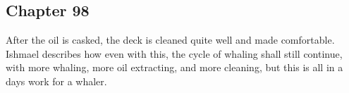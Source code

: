 \subsection{Chapter 98}

After the oil is casked, the deck is cleaned quite well and made comfortable.
Ishmael describes how even with this, the cycle of whaling shall still
continue, with more whaling, more oil extracting, and more cleaning, but this
is all in a days work for a whaler.
